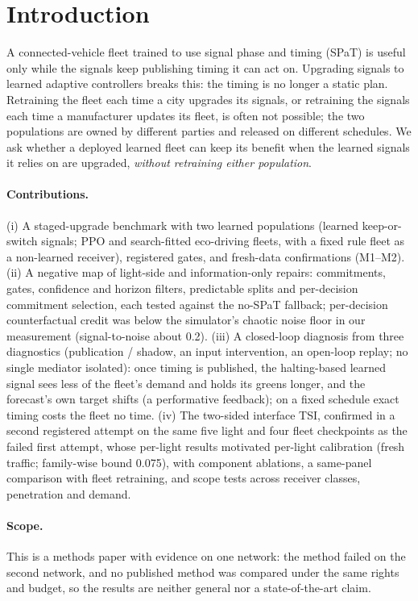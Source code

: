 \documentclass[11pt]{article}
\begin{document}
\section{Introduction}
A connected-vehicle fleet trained to use signal phase and timing (SPaT) is useful only while the signals keep publishing timing it can act
on. Upgrading signals to learned adaptive controllers breaks this: the timing is no longer a static plan. Retraining the fleet each time a
city upgrades its signals, or retraining the signals each time a manufacturer updates its fleet, is often not possible; the two populations
are owned by different parties and released on different schedules. We ask whether a deployed learned fleet can keep its benefit when the
learned signals it relies on are upgraded, \emph{without retraining either population}.
\paragraph{Contributions.}
(i) A staged-upgrade benchmark with two learned populations (learned keep-or-switch signals; PPO and search-fitted
eco-driving fleets, with a fixed rule fleet as a non-learned receiver),
registered gates, and fresh-data confirmations (M1--M2).
(ii) A negative map of light-side and information-only repairs: commitments, gates, confidence and horizon filters, predictable splits and
per-decision commitment selection, each tested against the no-SPaT fallback; per-decision counterfactual credit was below the
simulator's chaotic noise floor in our measurement (signal-to-noise about 0.2).
(iii) A closed-loop diagnosis from three diagnostics (publication / shadow, an input intervention, an open-loop replay; no single mediator
isolated): once timing is published, the halting-based learned signal sees less of the fleet's demand and holds its greens longer, and the
forecast's own target shifts (a performative feedback); on a fixed schedule exact timing costs the fleet no time.
(iv) The two-sided interface TSI, confirmed in a second registered attempt on the same five light and four fleet checkpoints as the failed
first attempt, whose per-light results motivated per-light calibration (fresh traffic; family-wise bound 0.075), with component ablations, a same-panel comparison
with fleet retraining, and scope tests across receiver classes, penetration and demand.
\paragraph{Scope.} This is a methods paper with evidence on one network: the method failed on the second network, and no
published method was compared under the same rights and budget, so the results are neither general nor a state-of-the-art claim.
\end{document}
